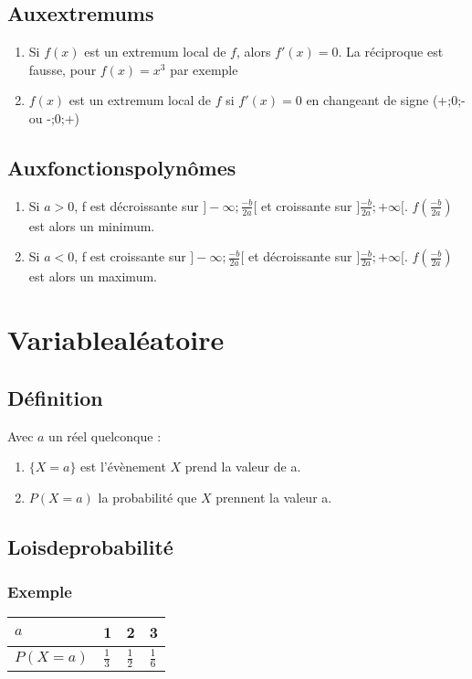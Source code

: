 \documentclass[a4paper,twoside,10pt,french,twocolumn]{scrartcl}
\begin{document}
\subsection{Aux\:extremums}
\begin{enumerate}
 \item Si $f(x)$ est un extremum local de $f$, alors $f'(x) = 0$. La réciproque est fausse, pour $f(x)=x^3$ par exemple
 \item $f(x)$ est un extremum local de $f$ si $f'(x) = 0$ en changeant de signe (+;0;- ou -;0;+)
\end{enumerate}
\subsection{Aux\:fonctions\:polynômes}
\begin{enumerate}
 \item Si $a>0$, f est décroissante sur $]-\infty; \frac{-b}{2a}[$ et croissante sur $]\frac{-b}{2a};+\infty[$. $f(\frac{-b}{2a})$ est alors un minimum.
 \item Si $a<0$, f est croissante sur $]-\infty; \frac{-b}{2a}[$ et décroissante sur $]\frac{-b}{2a};+\infty[$. $f(\frac{-b}{2a})$ est alors un maximum.
\end{enumerate}
\section{Variable\:aléatoire}
\subsection{Définition}
Avec $a$ un réel quelconque :
\begin{enumerate}
 \item $\{X=a\}$ est l'évènement $X$ prend la valeur de a.
 \item $P(X=a)$ la probabilité que $X$ prennent la valeur a.
\end{enumerate}
\subsection{Lois\:de\:probabilité}
\subsubsection{Exemple}
\begin{tabular}{|l|l|l|l|}\hline
$a$ & 1 & 2 & 3\\\hline
$P(X=a)$ & $\frac{1}{3}$ & $\frac{1}{2}$ & $\frac{1}{6}$\\\hline
\end{tabular}
\end{document}
